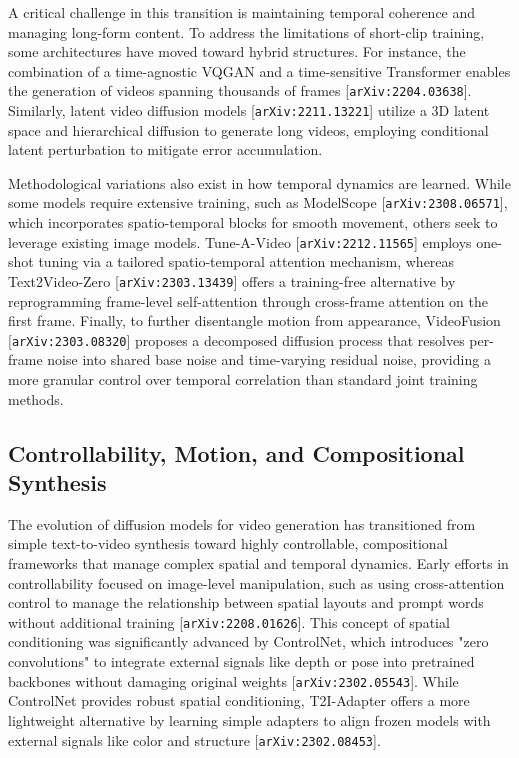 \documentclass[11pt]{article}
\begin{document}
A critical challenge in this transition is maintaining temporal coherence and managing long-form content. To address the limitations of short-clip training, some architectures have moved toward hybrid structures. For instance, the combination of a time-agnostic VQGAN and a time-sensitive Transformer enables the generation of videos spanning thousands of frames [\texttt{arXiv:2204.03638}]. Similarly, latent video diffusion models [\texttt{arXiv:2211.13221}] utilize a 3D latent space and hierarchical diffusion to generate long videos, employing conditional latent perturbation to mitigate error accumulation.

Methodological variations also exist in how temporal dynamics are learned. While some models require extensive training, such as ModelScope [\texttt{arXiv:2308.06571}], which incorporates spatio-temporal blocks for smooth movement, others seek to leverage existing image models. Tune-A-Video [\texttt{arXiv:2212.11565}] employs one-shot tuning via a tailored spatio-temporal attention mechanism, whereas Text2Video-Zero [\texttt{arXiv:2303.13439}] offers a training-free alternative by reprogramming frame-level self-attention through cross-frame attention on the first frame. Finally, to further disentangle motion from appearance, VideoFusion [\texttt{arXiv:2303.08320}] proposes a decomposed diffusion process that resolves per-frame noise into shared base noise and time-varying residual noise, providing a more granular control over temporal correlation than standard joint training methods.

\subsection{Controllability, Motion, and Compositional Synthesis}

The evolution of diffusion models for video generation has transitioned from simple text-to-video synthesis toward highly controllable, compositional frameworks that manage complex spatial and temporal dynamics. Early efforts in controllability focused on image-level manipulation, such as using cross-attention control to manage the relationship between spatial layouts and prompt words without additional training [\texttt{arXiv:2208.01626}]. This concept of spatial conditioning was significantly advanced by ControlNet, which introduces "zero convolutions" to integrate external signals like depth or pose into pretrained backbones without damaging original weights [\texttt{arXiv:2302.05543}]. While ControlNet provides robust spatial conditioning, T2I-Adapter offers a more lightweight alternative by learning simple adapters to align frozen models with external signals like color and structure [\texttt{arXiv:2302.08453}].
\end{document}

